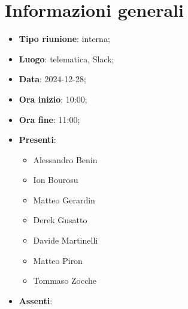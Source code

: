 \section{Informazioni generali}
\begin{itemize}
  \item \textbf{Tipo riunione}: interna;
  \item \textbf{Luogo}: telematica, Slack;
  \item \textbf{Data}: 2024-12-28;
  \item \textbf{Ora inizio}: 10:00;
  \item \textbf{Ora fine}: 11:00;
  
  \item \textbf{Presenti}:
  \begin{itemize}
    \item Alessandro Benin
    \item Ion Bourosu
    \item Matteo Gerardin
    \item Derek Gusatto
    \item Davide Martinelli
    \item Matteo Piron
    \item Tommaso Zocche
  \end{itemize}

  \item \textbf{Assenti}:
 
\end{itemize}